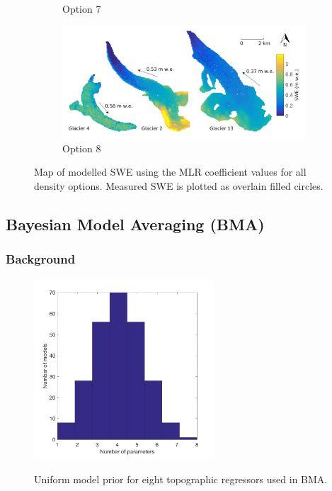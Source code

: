 \documentclass[12pt]{article}
\begin{document}
\begin{figure}
\begin{subfigure}[b]{0.475\textwidth}
            \caption[]%
            {{\small Option 7}}    
        \end{subfigure}
        \quad
        \begin{subfigure}[b]{0.475\textwidth}   
            \centering 
            \includegraphics[width=\textwidth]{MLRmap_Modelled_Observed_Opt8.png}
            \caption[]%
            {{\small Option 8}}    
        \end{subfigure}
        
        \caption[Map of modelled SWE using the MLR coefficient values for all density options. Measured SWE is plotted as overlain filled circles.]
        {\small Map of modelled SWE using the MLR coefficient values for all density options. Measured SWE is plotted as overlain filled circles.} 
        \label{fig:allMLRmodelled}
    \end{figure}
    



\subsection{Bayesian Model Averaging (BMA)}
\label{sec:BMS}

\subsubsection{Background}

\begin{figure}
	\centering
	\includegraphics[width = 0.6\textwidth]{DistributionOfNumParams_topoRegress.png}\\
	\caption{Uniform model prior for eight topographic regressors used in BMA.}
	\label{fig:uni_model_prior}
\end{figure}
\end{document}
